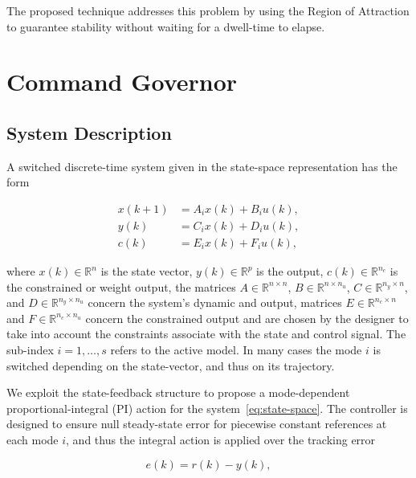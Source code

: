 The proposed technique addresses this problem by using the Region of Attraction
to guarantee stability without waiting for a dwell-time to elapse.

\section{Command Governor}%
\label{sec:command-governor}

\subsection{System Description}%
\label{subsec:system-description}

A switched discrete-time system given in the state-space representation has the
form

\begin{equation}
	\label{eq:state-space}
	\begin{aligned}
		x(k+1) & = A_{i}x(k)+B_{i}u(k), \\
		y(k)   & = C_{i}x(k)+D_{i}u(k), \\
		c(k)   & = E_{i}x(k)+F_{i}u(k),
	\end{aligned}
\end{equation}

where \(x(k)\in\mathbb{R}^n\) is the state vector, \(y(k)\in\mathbb{R}^p\) is the
output, \(c(k)\in\mathbb{R}^{n_c}\) is the constrained or weight output, the
matrices \(A\in\mathbb{R}^{n\times{}n}\), \(B\in\mathbb{R}^{n\times{}n_u}\),
\(C\in\mathbb{R}^{n_y\times{}n}\), and \(D\in\mathbb{R}^{n_y\times{}n_u}\) concern the
system's dynamic and output, matrices \(E\in\mathbb{R}^{n_c\times{}n}\) and
\(F\in\mathbb{R}^{n_c\times{}n_u}\) concern the constrained output and are chosen by
the designer to take into account the constraints associate with the state and
control signal. The sub-index \(i = 1,\ldots, s\) refers to the active model. In many
cases the mode \(i\) is switched depending on the state-vector, and thus on its
trajectory.

We exploit the state-feedback structure to propose a mode-dependent
proportional-integral (PI) action for the system~\eqref{eq:state-space}. The
controller is designed to ensure null steady-state error for piecewise constant
references at each mode \(i\), and thus the integral action is applied over the
tracking error~\parencite{lopes.leite.ea:anti-windup}

\begin{equation}
	\label{eq:r-y-error}
	e(k) = r(k)-y(k),
\end{equation}

